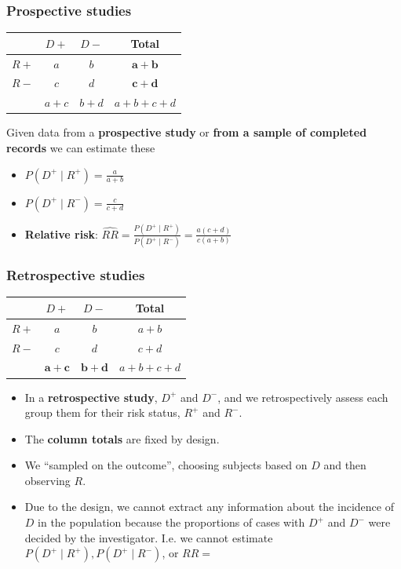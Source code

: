 \documentclass[a4paper]{article}
\begin{document}
\subsubsection{Prospective studies}
\begin{table}[H]
	\centering
	\begin{tabular}{@{}cccc@{}}
	\toprule
		     & \( D+ \)  & \( D- \)  & Total \\ \midrule
	\( R+ \) & \( a \)   & \( b \)   & \textcolor{myred}{\( \mathbf{a + b} \)} \\
	\( R- \) & \( c \)   & \( d \)   & \textcolor{myred}{\( \mathbf{c + d} \)} \\
		     & \( a+c \) & \( b+d \) & \( a + b + c + d \) \\ \bottomrule
	\end{tabular}
\end{table}
Given data from a \textcolor{myred}{\textbf{prospective study}} or \textcolor{myred}{\textbf{from a sample of completed records}} we can estimate these
\begin{itemize}
	\item \( P(D^+ \mid R^+) = \frac{a}{a+b} \)
	\item \( P(D^+ \mid R^-) = \frac{c}{c+d} \) 
	\item \textbf{Relative risk}: \( \widehat{RR} = \frac{P(D^+ \mid R^+)}{P(D^+ \mid R^-)} = \frac{a(c+d)}{c(a+b)} \) 
\end{itemize}
\subsubsection{Retrospective studies}
\begin{table}[H]
	\centering
	\begin{tabular}{@{}cccc@{}}
	\toprule
		     & \( D+ \)  & \( D- \)  & Total \\ \midrule
	\( R+ \) & \( a \)   & \( b \)   & \( a + b \) \\
	\( R- \) & \( c \)   & \( d \)   & \( c + d \) \\
		     & \textcolor{mygreen}{\( \mathbf{a + c} \)} & \textcolor{mygreen}{\( \mathbf{b + d} \)} & \( a + b + c + d \) \\ \bottomrule
	\end{tabular}
\end{table}
\begin{itemize}
	\item In a \textcolor{mygreen}{\textbf{retrospective study}}, \( D^+ \) and \( D^- \), and we retrospectively assess each group them for their risk status, \( R^+ \) and \( R^- \).
	\item The \textcolor{mygreen}{\textbf{column totals}} are fixed by design.
	\item We ``sampled on the outcome'', choosing subjects based on \( D \) and then observing \( R \).
	\item Due to the design, we cannot extract any information about the incidence of \( D \) in the population because the proportions of cases with \( D^+ \) and \( D^- \) were decided by the investigator. I.e. we cannot estimate \( P( D^+ \mid R^+), P(D^+ \mid R^-) \), or \( RR =  \) 
\end{itemize}
\end{document}

